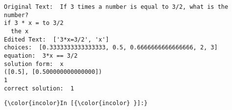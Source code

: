 \documentclass{article}
\begin{document}
    \begin{Verbatim}[commandchars=\\\{\}]
Original Text:  If 3 times a number is equal to 3/2, what is the number?
if 3 * x = to 3/2
  the x
Edited Text:  ['3*x=3/2', 'x']
choices:  [0.3333333333333333, 0.5, 0.6666666666666666, 2, 3]
equation:  3*x == 3/2
solution form:  x
([0.5], [0.500000000000000])
1
correct solution:  1
    \end{Verbatim}

    \begin{Verbatim}[commandchars=\\\{\}]
{\color{incolor}In [{\color{incolor} }]:} 
\end{Verbatim}


    
    
    
    
\end{document}
